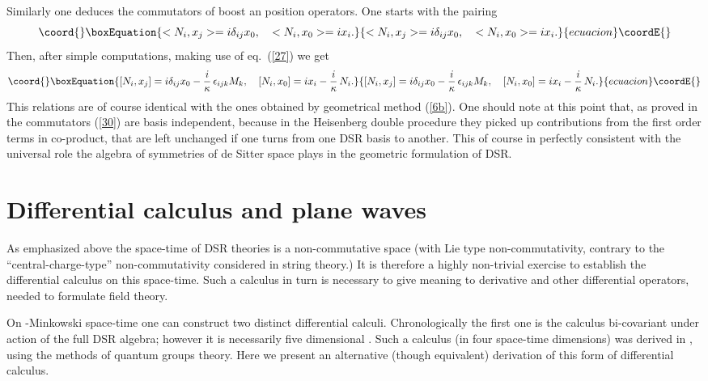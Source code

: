 \documentclass  [12pt] {article}
\begin{document}
Similarly one deduces the commutators of boost an position operators. One
starts with the pairing
\begin{equation}\coord{}\boxEquation{\label{29}
<N_i, x_j> = i \delta_{ij} x_0, \quad <N_i, x_0> = i  x_i.
}{<N_i, x_j> = i \delta_{ij} x_0, \quad <N_i, x_0> = i  x_i.
}{ecuacion}\coordE{}\end{equation}
Then, after simple computations, making use of  eq.~(\ref{27}) we get
\begin{equation}\coord{}\boxEquation{\label{30}
[N_i, x_j] = i \delta_{ij} x_0 - \frac{i}\kappa\, \epsilon_{ijk} M_k, \quad
[N_i, x_0] = i x_{i} - \frac{i}\kappa\, N_i.
}{[N_i, x_j] = i \delta_{ij} x_0 - \frac{i}\kappa\, \epsilon_{ijk} M_k, \quad
[N_i, x_0] = i x_{i} - \frac{i}\kappa\, N_i.
}{ecuacion}\coordE{}\end{equation}
This relations are of course identical with the ones obtained by geometrical
method (\ref{6b}). One should note at this point that, as proved in
\cite{Kowalski-Glikman:2002jr} the commutators (\ref{30}) are basis
independent, because in the Heisenberg double procedure they picked up
contributions from the first order terms in co-product, that are left unchanged
if one turns from one DSR basis to another. This of course in perfectly
consistent with the universal role the \coordHE{} algebra of symmetries
of de Sitter space plays in the geometric formulation of DSR.



\section{Differential calculus and plane waves}

As emphasized above the space-time of DSR theories is a non-commutative space
(with Lie type non-commutativity, contrary to the ``central-charge-type''
non-commutativity considered in string theory.) It is therefore a highly
non-trivial exercise to establish the differential calculus on this space-time.
Such a calculus in turn is necessary to give meaning to derivative and other
differential operators, needed to formulate field theory.

On \myHighlight{$\kappa$}\coordHE{}-Minkowski space-time one can construct two distinct differential
calculi. Chronologically the first one is the calculus bi-covariant under
action of the full DSR algebra; however it is necessarily five dimensional
\cite{5dcalc1}. Such a calculus (in four space-time dimensions) was derived in
\cite{5dcalc2}, \cite{5dcalc3} using the methods of quantum groups theory. Here
we present an alternative (though equivalent) derivation of this form of
differential calculus.
\end{document}
